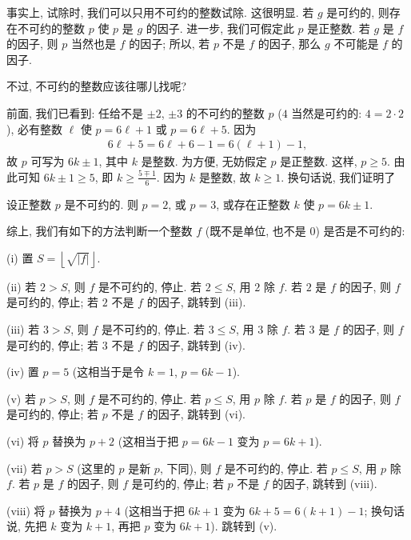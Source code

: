 事实上, 试除时, 我们可以只用不可约的整数试除. 这很明显. 若 $g$ 是可约的, 则存在不可约的整数 $p$ 使 $p$ 是 $g$ 的因子. 进一步, 我们可假定此 $p$ 是正整数. 若 $g$ 是 $f$ 的因子, 则 $p$ 当然也是 $f$ 的因子; 所以, 若 $p$ 不是 $f$ 的因子, 那么 $g$ 不可能是 $f$ 的因子.

不过, 不可约的整数应该往哪{\scriptsize 儿}找呢?

前面, 我们已看到: 任给不是 $\pm 2$, $\pm 3$ 的不可约的整数 $p$ ($4$ 当然是可约的: $4 = 2 \cdot 2$), 必有整数 $\ell$ 使 $p = 6\ell + 1$ 或 $p = 6\ell + 5$. 因为
\begin{align*}
    6\ell + 5 = 6\ell + 6 - 1 = 6(\ell + 1) - 1,
\end{align*}
故 $p$ 可写为 $6k \pm 1$, 其中 $k$ 是整数. 为方便, 无妨假定 $p$ 是正整数. 这样, $p \geq 5$. 由此可知 $6k \pm 1 \geq 5$, 即 $k \geq \frac{5 \mp 1}{6}$. 因为 $k$ 是整数, 故 $k \geq 1$. 换句话说, 我们证明了
\begin{proposition}
    设正整数 $p$ 是不可约的. 则 $p = 2$, 或 $p = 3$, 或存在正整数 $k$ 使 $p = 6k \pm 1$.
\end{proposition}

综上, 我们有如下的方法判断一个整数 $f$ (既不是单位, 也不是 $0$) 是否是不可约的:

(i) 置 $S = \left \lfloor \sqrt{|f|} \right \rfloor$.

(ii) 若 $2 > S$, 则 $f$ 是不可约的, 停止. 若 $2 \leq S$, 用 $2$ 除 $f$. 若 $2$ 是 $f$ 的因子, 则 $f$ 是可约的, 停止; 若 $2$ 不是 $f$ 的因子, 跳转到 (iii).

(iii) 若 $3 > S$, 则 $f$ 是不可约的, 停止. 若 $3 \leq S$, 用 $3$ 除 $f$. 若 $3$ 是 $f$ 的因子, 则 $f$ 是可约的, 停止; 若 $3$ 不是 $f$ 的因子, 跳转到 (iv).

(iv) 置 $p = 5$ (这相当于是令 $k = 1$, $p = 6k - 1$).

(v) 若 $p > S$, 则 $f$ 是不可约的, 停止. 若 $p \leq S$, 用 $p$ 除 $f$. 若 $p$ 是 $f$ 的因子, 则 $f$ 是可约的, 停止; 若 $p$ 不是 $f$ 的因子, 跳转到 (vi).

(vi) 将 $p$ 替换为 $p + 2$ (这相当于把 $p = 6k - 1$ 变为 $p = 6k + 1$).

(vii) 若 $p > S$ (这里的 $p$ 是新 $p$, 下同), 则 $f$ 是不可约的, 停止. 若 $p \leq S$, 用 $p$ 除 $f$. 若 $p$ 是 $f$ 的因子, 则 $f$ 是可约的, 停止; 若 $p$ 不是 $f$ 的因子, 跳转到 (viii).

(viii) 将 $p$ 替换为 $p + 4$ (这相当于把 $6k + 1$ 变为 $6k + 5 = 6(k+1) - 1$; 换句话说, 先把 $k$ 变为 $k+1$, 再把 $p$ 变为 $6k+1$). 跳转到 (v).

